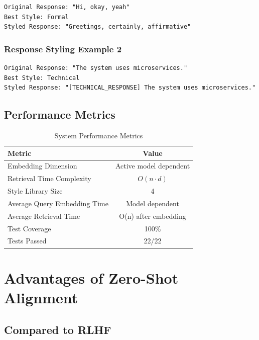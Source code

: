 \documentclass[11pt,a4paper]{article}
\begin{document}
\begin{lstlisting}[caption={Formal Alignment Example}]
Original Response: "Hi, okay, yeah"
Best Style: Formal
Styled Response: "Greetings, certainly, affirmative"
\end{lstlisting}

\subsubsection{Response Styling Example 2}

\begin{lstlisting}[caption={Technical Alignment Example}]
Original Response: "The system uses microservices."
Best Style: Technical
Styled Response: "[TECHNICAL_RESPONSE] The system uses microservices."
\end{lstlisting}

\subsection{Performance Metrics}

\begin{table}[H]
\centering
\begin{tabular}{|l|c|}
\toprule
\textbf{Metric} & \textbf{Value} \\
\midrule
Embedding Dimension & Active model dependent \\
Retrieval Time Complexity & $O(n \cdot d)$ \\
Style Library Size & 4 \\
Average Query Embedding Time & Model dependent \\
Average Retrieval Time & O(n) after embedding \\
Test Coverage & 100\% \\
Tests Passed & 22/22 \\
\bottomrule
\end{tabular}
\caption{System Performance Metrics}
\end{table}

\section{Advantages of Zero-Shot Alignment}

\subsection{Compared to RLHF}
\end{document}
